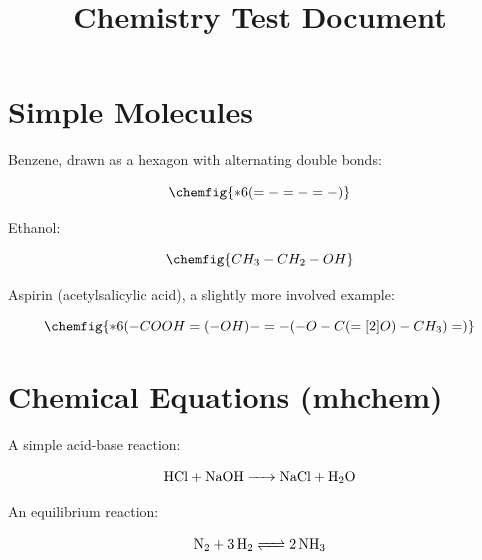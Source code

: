 \documentclass{article}
\title{Chemistry Test Document}
\author{}
\date{}
\begin{document}
\maketitle

\section{Simple Molecules}

Benzene, drawn as a hexagon with alternating double bonds:

\[
\chemfig{*6(=-=-=-)}
\]

Ethanol:

\[
\chemfig{CH_3-CH_2-OH}
\]

Aspirin (acetylsalicylic acid), a slightly more involved example:

\[
\chemfig{*6(-COOH=(-OH)-=-(-O-C(=[2]O)-CH_3)=)}
\]

\section{Chemical Equations (mhchem)}

A simple acid-base reaction:

\[
\ce{HCl + NaOH -> NaCl + H2O}
\]

An equilibrium reaction:

\[
\ce{N2 + 3H2 <=> 2NH3}
\]
\end{document}
